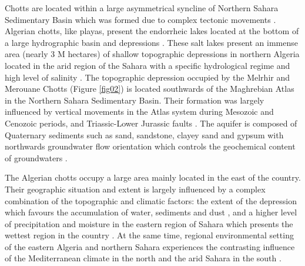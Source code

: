 \documentclass[asi,article,submit,pdftex,moreauthors]{Definitions/mdpi}
\begin{document}
Chotts are located within a large asymmetrical syncline of Northern Sahara Sedimentary Basin which was formed due to complex tectonic movements \cite{askri1995geology,Flotte}. Algerian chotts, like playas, present the endorrheic lakes located at the bottom of a large hydrographic basin and depressions \cite{Joly}. These salt lakes present an immense area (nearly 3 M hectares) of shallow topographic depressions in northern Algeria located in the arid region of the Sahara with a specific hydrological regime and high level of salinity \cite{chabour2018africa}. The topographic depression occupied by the Melrhir and Merouane Chotts (Figure \ref{fig02}) is located southwards of the Maghrebian Atlas in the Northern Sahara Sedimentary Basin. Their formation was largely influenced by vertical movements in the Atlas system during Mesozoic and Cenozoic periods, and Triassic-Lower Jurassic faults \cite{DELAMOTTE20099}. The aquifer is composed of Quaternary sediments such as sand, sandstone, clayey sand and gypsum with northwards groundwater flow orientation \cite{BOUSELSAL2022100747,BALLAIS1991209} which controls the geochemical content of groundwaters \cite{daoud1995caracterisation}.

The Algerian chotts occupy a large area mainly located in the east of the country. Their geographic situation and extent is largely influenced by a complex combination of the topographic and climatic factors: the extent of the depression which favours the accumulation of water, sediments and dust \cite{Klose,Goudie2022}, and a higher level of precipitation and moisture in the eastern region of Sahara which presents the wettest region in the country \cite{Nedjraoui,Benkhaled}. At the same time, regional environmental setting of the eastern Algeria and northern Sahara experiences the contrasting influence of the Mediterranean climate in the north and the arid Sahara in the south \cite{Ficheur,Mebarki}. 
\end{document}
